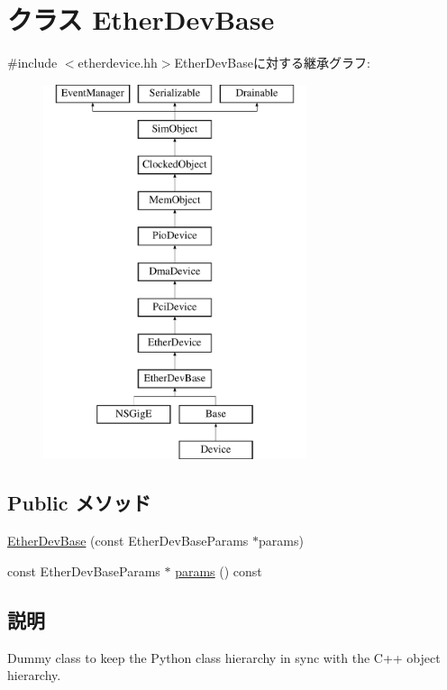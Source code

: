 \hypertarget{classEtherDevBase}{
\section{クラス EtherDevBase}
\label{classEtherDevBase}
}


{\ttfamily \#include $<$etherdevice.hh$>$}EtherDevBaseに対する継承グラフ:\begin{figure}[H]
\begin{center}
\leavevmode
\includegraphics[height=11cm]{classEtherDevBase}
\end{center}
\end{figure}
\subsection*{Public メソッド}
\begin{DoxyCompactItemize}
\item 
\hyperlink{classEtherDevBase_ab7264a855d427550154779e5d55eeab1}{EtherDevBase} (const EtherDevBaseParams $\ast$params)
\item 
const EtherDevBaseParams $\ast$ \hyperlink{classEtherDevBase_a24c177ef5d1124c3ff3e68a7e53532cf}{params} () const 
\end{DoxyCompactItemize}


\subsection{説明}
Dummy class to keep the Python class hierarchy in sync with the C++ object hierarchy.


